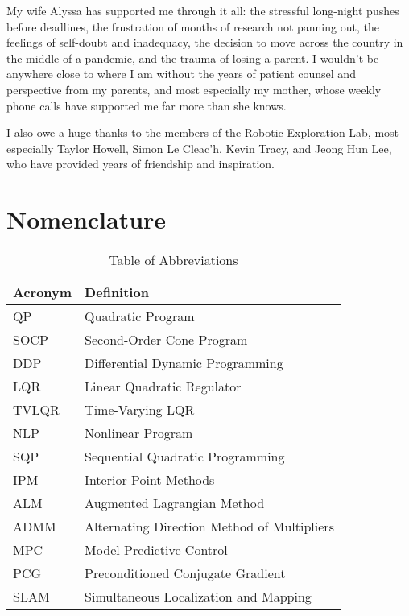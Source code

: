 \documentclass[10pt,oneside]{book}
\begin{document}
    My wife Alyssa has supported me through it all: the stressful long-night pushes before
    deadlines, the frustration of months of research not panning out, the feelings of 
    self-doubt and inadequacy, the decision to move across the country in the middle of a 
    pandemic, and the trauma of losing a parent. I wouldn't be anywhere close to where I am
    without the years of patient counsel and perspective from my parents, and most 
    especially my mother, whose weekly phone calls have supported me far more than she 
    knows. 

    I also owe a huge thanks to the members of the Robotic Exploration Lab, most especially
    Taylor Howell, Simon Le Cleac'h, Kevin Tracy, and Jeong Hun Lee, who have provided years
    of friendship and inspiration. 

    \tableofcontents
    \listoffigures
    \listoftables

    \chapter*{Nomenclature}
    \begin{table}[h]
    \centering
    \begin{tabular}{l l}
            Acronym & Definition \\
            \midrule
            QP   & Quadratic Program \\
            SOCP & Second-Order Cone Program \\
            DDP  & Differential Dynamic Programming \\
            LQR  & Linear Quadratic Regulator \\
            TVLQR & Time-Varying LQR \\
            NLP  & Nonlinear Program \\
            SQP  & Sequential Quadratic Programming \\
            IPM  & Interior Point Methods \\
            ALM  & Augmented Lagrangian Method \\
            ADMM & Alternating Direction Method of Multipliers \\
            MPC  & Model-Predictive Control \\
            PCG  & Preconditioned Conjugate Gradient \\
            SLAM & Simultaneous Localization and Mapping \\
    \end{tabular}
    \caption{Table of Abbreviations}
    \label{tab:abbreviations}
    \end{table}
    
\end{document}

